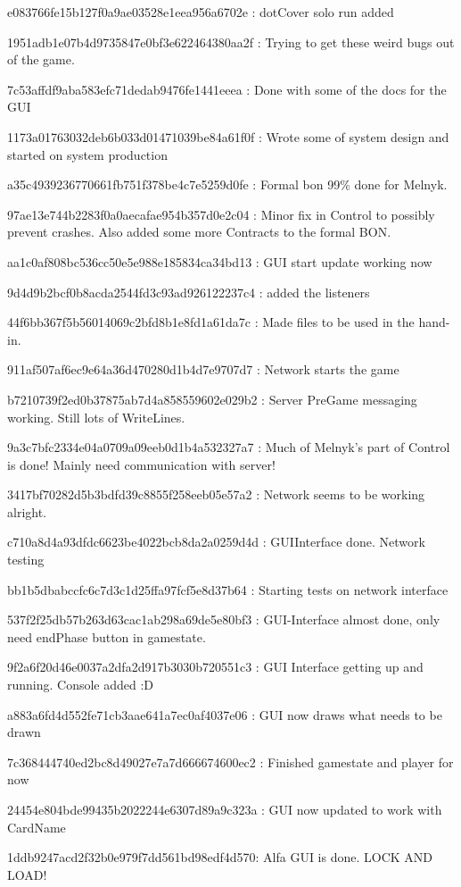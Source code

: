 e083766fe15b127f0a9ae03528e1eea956a6702e : dotCover solo run added

1951adb1e07b4d9735847e0bf3e622464380aa2f : Trying to get these weird bugs out of the game.

7c53affdf9aba583efc71dedab9476fe1441eeea : Done with some of the docs for the GUI

1173a01763032deb6b033d01471039be84a61f0f : Wrote some of system design and started on system production

a35c4939236770661fb751f378be4c7e5259d0fe : Formal bon 99\% done for Melnyk.

97ae13e744b2283f0a0aecafae954b357d0e2c04 : Minor fix in Control to possibly prevent crashes. Also added some more Contracts to the formal BON.

aa1c0af808bc536cc50e5e988e185834ca34bd13 : GUI start update working now

9d4d9b2bcf0b8acda2544fd3c93ad926122237c4 : added the listeners

44f6bb367f5b56014069c2bfd8b1e8fd1a61da7c : Made files to be used in the hand-in.

911af507af6ec9e64a36d470280d1b4d7e9707d7 : Network starts the game

b7210739f2ed0b37875ab7d4a858559602e029b2 : Server PreGame messaging working. Still lots of WriteLines.

9a3c7bfc2334e04a0709a09eeb0d1b4a532327a7 : Much of Melnyk's part of Control is done! Mainly need communication with server!

3417bf70282d5b3bdfd39c8855f258eeb05e57a2 : Network seems to be working alright.

c710a8d4a93dfdc6623be4022bcb8da2a0259d4d : GUIInterface done. Network testing

bb1b5dbabccfc6c7d3c1d25ffa97fcf5e8d37b64 : Starting tests on network interface

537f2f25db57b263d63cac1ab298a69de5e80bf3 : GUI-Interface almost done, only need endPhase button in gamestate.

9f2a6f20d46e0037a2dfa2d917b3030b720551c3 : GUI Interface getting up and running. Console added :D

a883a6fd4d552fe71cb3aae641a7ec0af4037e06 : GUI now draws what needs to be drawn

7c368444740ed2bc8d49027e7a7d666674600ec2 : Finished gamestate and player for now

24454e804bde99435b2022244e6307d89a9c323a : GUI now updated to work with CardName

1ddb9247acd2f32b0e979f7dd561bd98edf4d570: Alfa GUI is done. LOCK AND LOAD!

